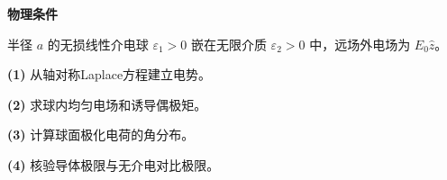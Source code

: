 \textbf{物理条件}\par 半径 \(a\) 的无损线性介电球 \(\varepsilon_1>0\) 嵌在无限介质 \(\varepsilon_2>0\) 中，远场外电场为 \(E_0\hat z\)。
\par\noindent\textbf{(1)} 从轴对称Laplace方程建立电势。
\par\noindent\textbf{(2)} 求球内均匀电场和诱导偶极矩。
\par\noindent\textbf{(3)} 计算球面极化电荷的角分布。
\par\noindent\textbf{(4)} 核验导体极限与无介电对比极限。
